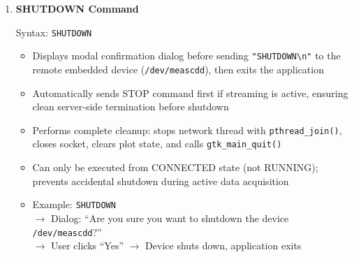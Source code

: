 \begin{enumerate}
    \begin{itemize}
        \item Sends ASCII \texttt{"STOP\textbackslash n"} command to halt sensor data streaming while maintaining the TCP connection for future operations
        \item Preserves all captured data in circular buffers allowing graph inspection after streaming stops; data persists until disconnect or reconnect
        \item Transitions state from RUNNING to CONNECTED, re-enabling Disconnect and Shutdown buttons while disabling sensor configuration controls
        \item Does not terminate the network receive thread; connection remains active and ready to resume streaming with subsequent START command
        \item Example: \texttt{STOP}
        \item Typical Workflow Example:
        \begin{enumerate}
            \item \texttt{START}
            \item (Observe data for analysis)
            \item \texttt{STOP}
            \item (Graph frozen, data preserved for inspection)
            \item \texttt{START} (can restart streaming)
        \end{enumerate}
    \end{itemize}

    \item \textbf{SHUTDOWN Command}

    Syntax: \texttt{SHUTDOWN}

    \begin{itemize}
        \item Displays modal confirmation dialog before sending \texttt{"SHUTDOWN\textbackslash n"} to the remote embedded device (\texttt{/dev/meascdd}), then exits the application
        \item Automatically sends STOP command first if streaming is active, ensuring clean server-side termination before shutdown
        \item Performs complete cleanup: stops network thread with \texttt{pthread\_join()}, closes socket, clears plot state, and calls \texttt{gtk\_main\_quit()}
        \item Can only be executed from CONNECTED state (not RUNNING); prevents accidental shutdown during active data acquisition
        \item Example: \texttt{SHUTDOWN} \\
        \(\rightarrow\) Dialog: ``Are you sure you want to shutdown the device \texttt{/dev/meascdd}?'' \\
        \(\rightarrow\) User clicks ``Yes'' \(\rightarrow\) Device shuts down, application exits
    \end{itemize}

\end{enumerate}

